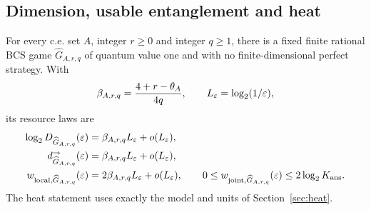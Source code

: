 \subsection{Dimension, usable entanglement and heat}
\begin{theorem}\label{thm:gate-resources}
For every c.e. set $A$, integer $r\ge0$ and integer $q\ge1$, there is a fixed finite rational BCS game $\widehat G_{A,r,q}$ of quantum value one and with no finite-dimensional perfect strategy. With
\[
 \beta_{A,r,q}=\frac{4+r-\theta_A}{4q},\qquad L_\varepsilon=\log_2(1/\varepsilon),
\]
its resource laws are
\begin{align}
 \log_2D_{\widehat G_{A,r,q}}(\varepsilon)&=\beta_{A,r,q}L_\varepsilon+o(L_\varepsilon),\label{eq:gate-game-law}\\
 d^\to_{\widehat G_{A,r,q}}(\varepsilon)&=\beta_{A,r,q}L_\varepsilon+o(L_\varepsilon),\label{eq:gate-usable-law}\\
 w_{{\rm local},\widehat G_{A,r,q}}(\varepsilon)&=2\beta_{A,r,q}L_\varepsilon+o(L_\varepsilon),\qquad
 0\le w_{{\rm joint},\widehat G_{A,r,q}}(\varepsilon)\le2\log_2K_{\rm ans}.\label{eq:gate-heat-law}
\end{align}
The heat statement uses exactly the model and units of Section~\ref{sec:heat}.
\end{theorem}
